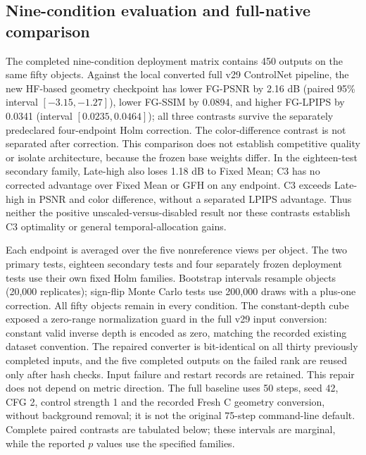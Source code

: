 \documentclass[11pt]{article}
\begin{document}
\subsection*{Nine-condition evaluation and full-native comparison}\label{supp:native-trained50}
The completed nine-condition deployment matrix contains 450 outputs on the same fifty objects. Against the local converted full v29 ControlNet pipeline, the new HF-based geometry checkpoint has lower FG-PSNR by 2.16 dB (paired 95\% interval $[-3.15,-1.27]$), lower FG-SSIM by 0.0894, and higher FG-LPIPS by 0.0341 (interval $[0.0235,0.0464]$); all three contrasts survive the separately predeclared four-endpoint Holm correction. The color-difference contrast is not separated after correction. This comparison does not establish competitive quality or isolate architecture, because the frozen base weights differ. In the eighteen-test secondary family, Late-high also loses 1.18 dB to Fixed Mean; C3 has no corrected advantage over Fixed Mean or GFH on any endpoint. C3 exceeds Late-high in PSNR and color difference, without a separated LPIPS advantage. Thus neither the positive unscaled-versus-disabled result nor these contrasts establish C3 optimality or general temporal-allocation gains.

Each endpoint is averaged over the five nonreference views per object. The two primary tests, eighteen secondary tests and four separately frozen deployment tests use their own fixed Holm families. Bootstrap intervals resample objects (20,000 replicates); sign-flip Monte Carlo tests use 200,000 draws with a plus-one correction. All fifty objects remain in every condition. The constant-depth cube exposed a zero-range normalization guard in the full v29 input conversion: constant valid inverse depth is encoded as zero, matching the recorded existing dataset convention. The repaired converter is bit-identical on all thirty previously completed inputs, and the five completed outputs on the failed rank are reused only after hash checks. Input failure and restart records are retained. This repair does not depend on metric direction. The full baseline uses 50 steps, seed 42, CFG 2, control strength 1 and the recorded Fresh C geometry conversion, without background removal; it is not the original 75-step command-line default. Complete paired contrasts are tabulated below; these intervals are marginal, while the reported $p$ values use the specified families.
\end{document}
